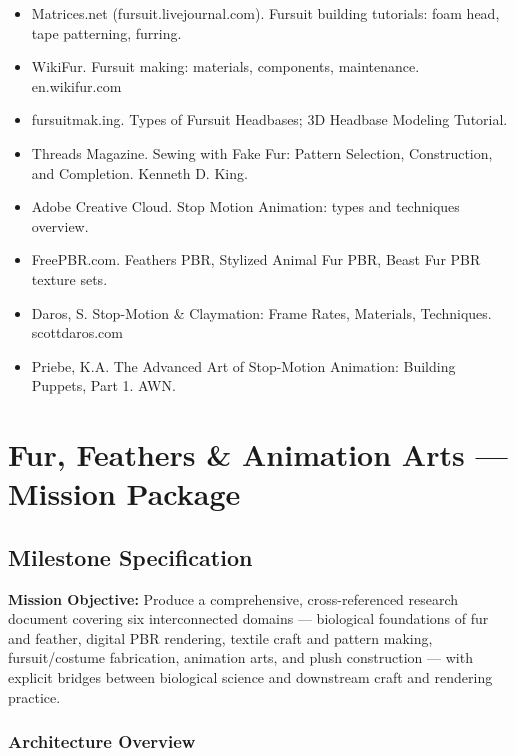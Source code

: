 \documentclass[11pt,letterpaper]{article}
\newcommand{\stageheader}[2]{%
  \noindent\colorbox{#2}{\makebox[\textwidth][l]{%
    \textcolor{white}{\bfseries\sffamily\hspace{6pt}#1\hspace{6pt}}}}%
  \vspace{0.5em}\par%
}
\begin{document}
\begin{itemize}[noitemsep]
  \item Matrices.net (fursuit.livejournal.com). Fursuit building tutorials: foam head, tape patterning, furring.
  \item WikiFur. Fursuit making: materials, components, maintenance. en.wikifur.com
  \item fursuitmak.ing. Types of Fursuit Headbases; 3D Headbase Modeling Tutorial.
  \item Threads Magazine. Sewing with Fake Fur: Pattern Selection, Construction, and Completion. Kenneth D. King.
  \item Adobe Creative Cloud. Stop Motion Animation: types and techniques overview.
  \item FreePBR.com. Feathers PBR, Stylized Animal Fur PBR, Beast Fur PBR texture sets.
  \item Daros, S. Stop-Motion \& Claymation: Frame Rates, Materials, Techniques. scottdaros.com
  \item Priebe, K.A. The Advanced Art of Stop-Motion Animation: Building Puppets, Part 1. AWN.
\end{itemize}

\newpage

\stageheader{STAGE 3 --- MISSION PACKAGE}{tertiary}

\section{Fur, Feathers \& Animation Arts --- Mission Package}

\subsection{Milestone Specification}

\textbf{Mission Objective:} Produce a comprehensive, cross-referenced research document covering six interconnected domains --- biological foundations of fur and feather, digital PBR rendering, textile craft and pattern making, fursuit/costume fabrication, animation arts, and plush construction --- with explicit bridges between biological science and downstream craft and rendering practice.

\subsubsection{Architecture Overview}
\end{document}
